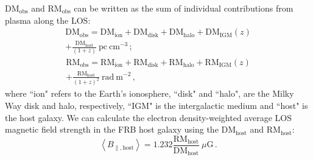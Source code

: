 \documentclass[twocolumn, linenumbers]{aastex701}
\begin{document}
$\mathrm{DM}_\mathrm{obs}$ and $\mathrm{RM}_\mathrm{obs}$ can be written as the sum of individual contributions from plasma along the LOS:
\begin{multline}
\mathrm{DM}_\mathrm{obs} = \mathrm{DM}_{\mathrm{ion}} + \mathrm{DM}_{\mathrm{disk}} + \mathrm{DM}_{\mathrm{halo}} + \mathrm{DM}_{\mathrm{IGM}}(z) \\
+ \frac{\mathrm{DM}_{\mathrm{host}}}{(1 + z)}~\mathrm{pc}~\mathrm{cm}^{-3}\,; \label{eq:dm_comps}
\end{multline}
\begin{multline}
\mathrm{RM}_\mathrm{obs} = \mathrm{RM}_{\mathrm{ion}} + \mathrm{RM}_{\mathrm{disk}} + \mathrm{RM}_{\mathrm{halo}} + \mathrm{RM}_{\mathrm{IGM}}(z) \\
+ \frac{\mathrm{RM}_{\mathrm{host}}}{(1+z)^2}~\mathrm{rad}~\mathrm{m}^{-2}\,, \label{eq:rm_comps}
\end{multline}
where ``ion" refers to the Earth's ionosphere, ``disk" and ``halo", are the Milky Way disk and halo, respectively, ``IGM" is the intergalactic medium and ``host" is the host galaxy. We can calculate the electron density-weighted average LOS magnetic field strength in the FRB host galaxy using the $\mathrm{DM}_{\mathrm{host}}$ and $\mathrm{RM}_{\mathrm{host}}$:
\begin{equation}
\left<B_{\parallel,\mathrm{host}}\right> = 1.232 \frac{\mathrm{RM}_\mathrm{host}}{\mathrm{DM}_\mathrm{host}}~\mu\text{G}\,. \label{eq:b_host}
\end{equation}
\end{document}

